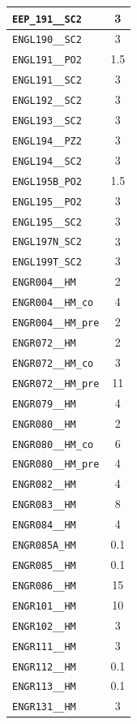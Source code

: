 \begin{longtable}{|p{}|c|}
    \verb|EEP_191__SC2| & 3\\\hline
    \verb|ENGL190__SC2| & 3\\\hline
    \verb|ENGL191__PO2| & 1.5\\\hline
    \verb|ENGL191__SC2| & 3\\\hline
    \verb|ENGL192__SC2| & 3\\\hline
    \verb|ENGL193__SC2| & 3\\\hline
    \verb|ENGL194__PZ2| & 3\\\hline
    \verb|ENGL194__SC2| & 3\\\hline
    \verb|ENGL195B_PO2| & 1.5\\\hline
    \verb|ENGL195__PO2| & 3\\\hline
    \verb|ENGL195__SC2| & 3\\\hline
    \verb|ENGL197N_SC2| & 3\\\hline
    \verb|ENGL199T_SC2| & 3\\\hline
    \verb|ENGR004__HM| & 2\\\hline
    \verb|ENGR004__HM_co| & 4\\\hline
    \verb|ENGR004__HM_pre| & 2\\\hline
    \verb|ENGR072__HM| & 2\\\hline
    \verb|ENGR072__HM_co| & 3\\\hline
    \verb|ENGR072__HM_pre| & 11\\\hline
    \verb|ENGR079__HM| & 4\\\hline
    \verb|ENGR080__HM| & 2\\\hline
    \verb|ENGR080__HM_co| & 6\\\hline
    \verb|ENGR080__HM_pre| & 4\\\hline
    \verb|ENGR082__HM| & 4\\\hline
    \verb|ENGR083__HM| & 8\\\hline
    \verb|ENGR084__HM| & 4\\\hline
    \verb|ENGR085A_HM| & 0.1\\\hline
    \verb|ENGR085__HM| & 0.1\\\hline
    \verb|ENGR086__HM| & 15\\\hline
    \verb|ENGR101__HM| & 10\\\hline
    \verb|ENGR102__HM| & 3\\\hline
    \verb|ENGR111__HM| & 3\\\hline
    \verb|ENGR112__HM| & 0.1\\\hline
    \verb|ENGR113__HM| & 0.1\\\hline
    \verb|ENGR131__HM| & 3\\\hline

\end{longtable}
